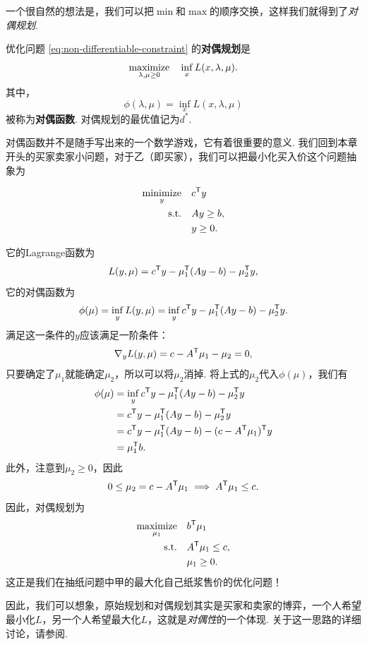 一个很自然的想法是，我们可以把$\min$和$\max$的顺序交换，这样我们就得到了\emph{对偶规划}.

\begin{definition}[对偶规划和对偶函数]
    优化问题 \eqref{eq:non-differentiable-constraint} 的\textbf{对偶规划}是
    \[\operatorname*{maximize}_{\lambda,\mu\geq 0}\quad \inf_{x} L(x,\lambda,\mu).\]
    其中，
    \[\phi(\lambda,\mu)=\inf_{x} L(x,\lambda,\mu)\]
    被称为\textbf{对偶函数}. 对偶规划的最优值记为$d^*$.
\end{definition}

对偶函数并不是随手写出来的一个数学游戏，它有着很重要的意义. 我们回到本章开头的买家卖家小问题，对于乙（即买家），我们可以把最小化买入价这个问题抽象为

\begin{equation}
\begin{aligned}
    \operatorname*{minimize}_y\quad& c^{\mathsf{T}} y \\
    \text{s.t.}\quad& Ay\geq b,\\
    & y\geq 0.
\end{aligned}\label{eq:linear-programming}
\end{equation}

它的Lagrange函数为
\[L(y,\mu)=c^{\mathsf{T}} y-\mu_1^{\mathsf{T}} (Ay-b)-\mu_2^{\mathsf{T}} y,\]
它的对偶函数为
\[\phi(\mu)=\inf_{y} L(y,\mu)=\inf_{y} c^{\mathsf{T}} y-\mu_1^{\mathsf{T}} (Ay-b)-\mu_2^{\mathsf{T}} y.\]
满足这一条件的$y$应该满足一阶条件：
\[\nabla_y L(y,\mu)=c-A^{\mathsf{T}} \mu_1-\mu_2=0,\]
只要确定了$\mu_1$就能确定$\mu_2$，所以可以将$\mu_2$消掉. 将上式的$\mu_2$代入$\phi(\mu)$，我们有
\begin{align*}
    \phi(\mu)&=\inf_{y} c^{\mathsf{T}} y-\mu_1^{\mathsf{T}} (Ay-b)-\mu_2^{\mathsf{T}} y\\
    &=c^{\mathsf{T}} y-\mu_1^{\mathsf{T}} (Ay-b)-\mu_2^{\mathsf{T}} y\\
    &=c^{\mathsf{T}} y-\mu_1^{\mathsf{T}} (Ay-b)-(c-A^{\mathsf{T}} \mu_1)^{\mathsf{T}} y\\
    &=\mu_1^{\mathsf{T}} b.
\end{align*}
此外，注意到$\mu_2\geq 0$，因此
\[
    0\leq \mu_2=c-A^{\mathsf{T}} \mu_1\implies A^{\mathsf{T}} \mu_1\leq c.
\]
因此，对偶规划为
\begin{equation}
\begin{aligned}
    \operatorname*{maximize}_{\mu_1}\quad& b^{\mathsf{T}} \mu_1 \\
    \text{s.t.}\quad& A^{\mathsf{T}} \mu_1\leq c,\\
    & \mu_1\geq 0.
\end{aligned}\label{eq:linear-programming-dual}
\end{equation}
这正是我们在抽纸问题中甲的最大化自己纸浆售价的优化问题！

因此，我们可以想象，原始规划和对偶规划其实是买家和卖家的博弈，一个人希望最小化$L$，另一个人希望最大化$L$，这就是\emph{对偶性}的一个体现. 关于这一思路的详细讨论，请参阅. 

